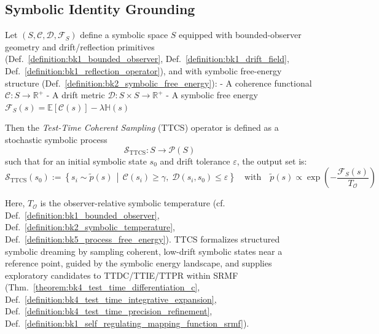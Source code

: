 \subsection{Symbolic Identity Grounding}
\label{subsec:bk4_symbolic_identity_grounding}
\begin{definition}
\label{definition:bk4_test_time_coherent_sampling}
Let $(S, \mathcal{C}, \mathcal{D}, \mathcal{F}_S)$ define a symbolic space $S$ equipped with bounded-observer geometry and drift/reflection primitives (Def.~\ref{definition:bk1_bounded_observer}, Def.~\ref{definition:bk1_drift_field}, Def.~\ref{definition:bk1_reflection_operator}), and with symbolic free-energy structure (Def.~\ref{definition:bk2_symbolic_free_energy}):
- A coherence functional $\mathcal{C}: S \to \mathbb{R}^+$
- A drift metric $\mathcal{D}: S \times S \to \mathbb{R}^+$
- A symbolic free energy $\mathcal{F}_S(s) = \mathbb{E}[\mathcal{C}(s)] - \lambda \mathbb{H}(s)$

Then the \emph{Test-Time Coherent Sampling} (TTCS) operator is defined as a stochastic symbolic process
\[
\mathcal{S}_{\text{TTCS}}: S \to \mathcal{P}(S)
\]
such that for an initial symbolic state $s_0$ and drift tolerance $\varepsilon$, the output set is:
\[
\mathcal{S}_{\text{TTCS}}(s_0) := \left\{ s_i \sim \tilde{p}(s) \, \middle| \, \mathcal{C}(s_i) \geq \gamma, \; \mathcal{D}(s_i, s_0) \leq \varepsilon \right\}
\quad \text{with} \quad 
\tilde{p}(s) \propto \exp\left( -\frac{\mathcal{F}_S(s)}{T_{\mathcal{O}}} \right)
\]

Here, $T_{\mathcal{O}}$ is the observer-relative symbolic temperature (cf. Def.~\ref{definition:bk1_bounded_observer}, Def.~\ref{definition:bk2_symbolic_temperature}, Def.~\ref{definition:bk5_process_free_energy}). TTCS formalizes structured symbolic dreaming by sampling coherent, low-drift symbolic states near a reference point, guided by the symbolic energy landscape, and supplies exploratory candidates to TTDC/TTIE/TTPR within SRMF (Thm.~\ref{theorem:bk4_test_time_differentiation_c}, Def.~\ref{definition:bk4_test_time_integrative_expansion}, Def.~\ref{definition:bk4_test_time_precision_refinement}, Def.~\ref{definition:bk1_self_regulating_mapping_function_srmf}).
\end{definition}

